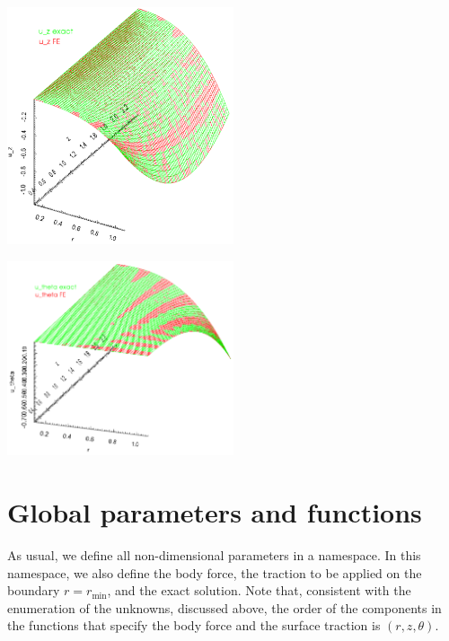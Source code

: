 \begin{DoxyImage}
\includegraphics[width=0.5\textwidth]{u_z}
\end{DoxyImage}
  
\begin{DoxyImage}
\includegraphics[width=0.5\textwidth]{u_theta}
\end{DoxyImage}




 

\hypertarget{index_global_namespace}{}\section{Global parameters and functions}\label{index_global_namespace}
As usual, we define all non-\/dimensional parameters in a namespace. In this namespace, we also define the body force, the traction to be applied on the boundary $ r=r_\mathrm{min} $, and the exact solution. Note that, consistent with the enumeration of the unknowns, discussed above, the order of the components in the functions that specify the body force and the surface traction is $ (r,z,\theta) $.

